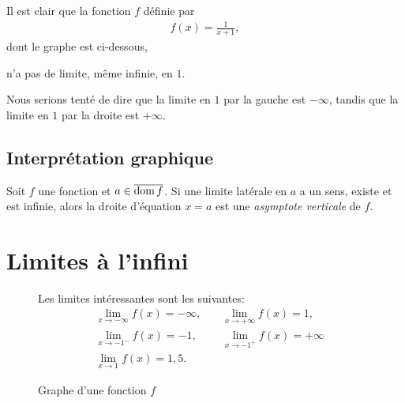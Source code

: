 \documentclass[main.tex]{subfiles}
\begin{document}
\begin{example}

    Il est clair que la fonction $f$ définie par
    \begin{align}
        f(x) = \frac 1 {x + 1},
    \end{align}
    dont le graphe est ci-dessous,
    \begin{center}
        \begin{plot}{0.5}{-6}{-6}{6}{6}
        \end{plot}
    \end{center}
    n'a pas de limite, même infinie, en $1$.
\end{example}

Nous serions tenté de dire que la limite en $1$ par la gauche est $-\infty$,
tandis que la limite en $1$ par la droite est $+\infty$.

\subsection{Interprétation graphique}

\begin{definition}

    Soit $f$ une fonction et $a \in \overline{\operatorname{dom} f}$.
    Si une limite latérale en $a$ a un sens, existe et est infinie,
    alors la droite d'équation $x = a$ est
    une \emph{asymptote verticale} de $f$.
\end{definition}

\section{Limites à l'infini}

\begin{figure}
    \centering
    \begin{plot}{0.25}{-10}{-10}{10}{10}
    \end{plot}
    \caption{Graphe d'une fonction $f$}
    Les limites intéressantes sont les suivantes:
    \begin{align}
        &\lim_{x \to -\infty} f(x) = -\infty, \quad
        &\lim_{x \to +\infty} f(x) = 1,\\
        &\lim_{x \to -1^-} f(x) = -1, \quad
        &\lim_{x \to -1^+} f(x) = +\infty\\
        &\lim_{x \to 1} f(x) = 1,5.
    \end{align}
\end{figure}
\end{document}
